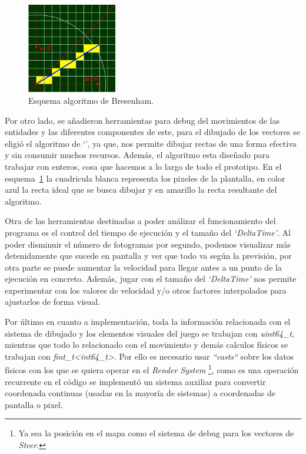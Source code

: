 \begin{figure}[ht]
\centering
\includegraphics[width=0.35\textwidth]{imagenes/diario_desarrollo/linea_ideal.png}
\caption{Esquema algoritmo de Bresenham.}
\label{fig:bresenham}
\end{figure} 

Por otro lado, se añadieron herramientas para debug del movimientos de las entidades y las
diferentes componentes de este, para el dibujado de los vectores se eligió el algoritmo de
`\citeauthor*{Bresenham1962}', ya que, nos permite dibujar rectas de una forma efectiva
y sin consumir muchos recursos. Además, el algoritmo esta diseñado para trabajar con enteros,
cosa que hacemos a lo largo de todo el prototipo. En el esquema~\ref{fig:bresenham} la 
cuadricula blanca representa los pixeles de la plantalla, en color azul la recta ideal que
se busca dibujar y en amarillo la recta resultante del algoritmo.

Otra de las herramientas destinadas a poder análizar el funcionamiento del programa es
el control del tiempo de ejecución y el tamaño del \textit{`DeltaTime'}. Al poder disminuir
el número de fotogramas por segundo, podemos visualizar más detenidamente que sucede en
pantalla y ver que todo va según la previsión, por otra parte se puede aumentar la velocidad
para llegar antes a un punto de la ejecución en concreto. Además, jugar con el tamaño del
\textit{`DeltaTime'} nos permite experimentar con los valores de velocidad y/o otros factores
interpolados para ajustarlos de forma visual. 

Por último en cuanto a implementación, toda la información relacionada con el sistema de 
dibujado y los elementos visuales del juego se trabajan con \textit{uint64\_t}, mientras que
todo lo relacionado con el movimiento y demás calculos físicos se trabajan con
\textit{fint\_t\textless int64\_t\textgreater}. Por ello es necesario usar \textit{``casts``}
sobre los datos físicos con los que se quiera operar en el \textit{Render System}
\footnote{Ya sea la posición en el mapa como el sistema de debug para los vectores de
\textit{Steer}.}, como es una operación recurrente en el código se implementó un sistema 
auxiliar para convertir coordenada continuas (usadas en la mayoría de sistemas) a coordenadas de 
pantalla o pixel. 

